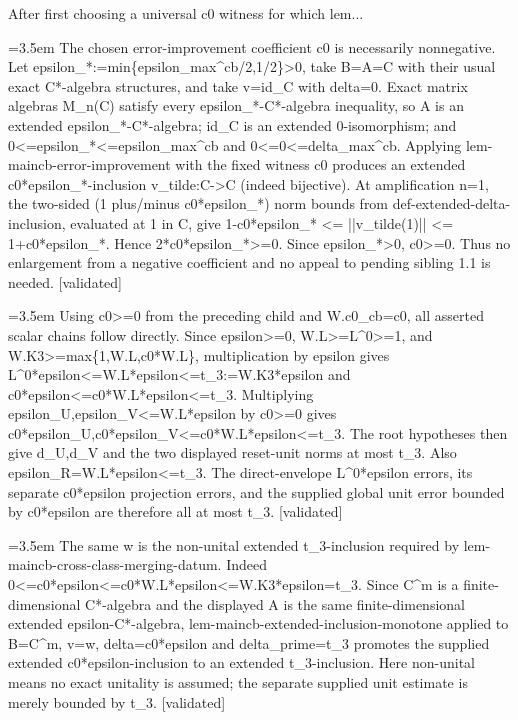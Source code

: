 \documentclass{article}
\newcommand{\step}[1]{\par\noindent\hangindent=3.5em\hangafter=1%
  \makebox[3.5em][l]{\textbf{#1.}}}
\newcommand{\steptag}[1]{\hfill{\small\textsf{[#1]}}}
\begin{document}
\begin{proofbox}{After first choosing a universal c0 witness for which lem...}
\step{1.4.1} The chosen error-improvement coefficient c0 is necessarily nonnegative. Let epsilon\_*:=min\{epsilon\_max\textasciicircum{}cb/2,1/2\}>0, take B=A=C with their usual exact C*-algebra structures, and take v=id\_C with delta=0. Exact matrix algebras M\_n(C) satisfy every epsilon\_*-C*-algebra inequality, so A is an extended epsilon\_*-C*-algebra; id\_C is an extended 0-isomorphism; and 0<=epsilon\_*<=epsilon\_max\textasciicircum{}cb and 0<=0<=delta\_max\textasciicircum{}cb. Applying lem-maincb-error-improvement with the fixed witness c0 produces an extended c0*epsilon\_*-inclusion v\_tilde:C->C (indeed bijective). At amplification n=1, the two-sided (1 plus/minus c0*epsilon\_*) norm bounds from def-extended-delta-inclusion, evaluated at 1 in C, give 1-c0*epsilon\_* <= ||v\_tilde(1)|| <= 1+c0*epsilon\_*. Hence 2*c0*epsilon\_*>=0. Since epsilon\_*>0, c0>=0. Thus no enlargement from a negative coefficient and no appeal to pending sibling 1.1 is needed. \steptag{validated} \\[4pt]
\step{1.4.2} Using c0>=0 from the preceding child and W.c0\_cb=c0, all asserted scalar chains follow directly. Since epsilon>=0, W.L>=L\textasciicircum{}0>=1, and W.K3>=max\{1,W.L,c0*W.L\}, multiplication by epsilon gives L\textasciicircum{}0*epsilon<=W.L*epsilon<=t\_3:=W.K3*epsilon and c0*epsilon<=c0*W.L*epsilon<=t\_3. Multiplying epsilon\_U,epsilon\_V<=W.L*epsilon by c0>=0 gives c0*epsilon\_U,c0*epsilon\_V<=c0*W.L*epsilon<=t\_3. The root hypotheses then give d\_U,d\_V and the two displayed reset-unit norms at most t\_3. Also epsilon\_R=W.L*epsilon<=t\_3. The direct-envelope L\textasciicircum{}0*epsilon errors, its separate c0*epsilon projection errors, and the supplied global unit error bounded by c0*epsilon are therefore all at most t\_3. \steptag{validated} \\[4pt]
\step{1.5} The same w is the non-unital extended t\_3-inclusion required by lem-maincb-cross-class-merging-datum. Indeed 0<=c0*epsilon<=c0*W.L*epsilon<=W.K3*epsilon=t\_3. Since C\textasciicircum{}m is a finite-dimensional C*-algebra and the displayed A is the same finite-dimensional extended epsilon-C*-algebra, lem-maincb-extended-inclusion-monotone applied to B=C\textasciicircum{}m, v=w, delta=c0*epsilon and delta\_prime=t\_3 promotes the supplied extended c0*epsilon-inclusion to an extended t\_3-inclusion. Here non-unital means no exact unitality is assumed; the separate supplied unit estimate is merely bounded by t\_3. \steptag{validated} \\[4pt]

\end{proofbox}
\end{document}
